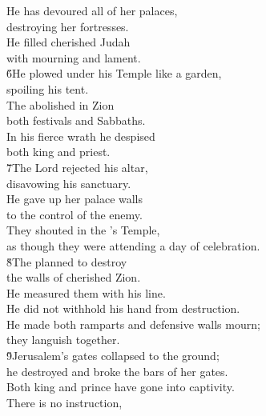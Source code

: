 \begin{poetry}
\poeml He has devoured all of her palaces, \\
\poemll    destroying her fortresses. \\
\poeml He filled cherished Judah \\
\poemll    with mourning and lament. \\
\poeml \v{6}He plowed under his Temple like a garden, \\
\poemll    spoiling his tent. \\
\poeml The  abolished in Zion \\
\poemll    both festivals and Sabbaths. \\
\poeml In his fierce wrath he despised \\
\poemll    both king and priest. \\
\poeml \v{7}The Lord rejected his altar, \\
\poemll    disavowing his sanctuary. \\
\poeml He gave up her palace walls \\
\poemll    to the control of the enemy. \\
\poeml They shouted in the 's Temple, \\
\poemll    as though they were attending a day of celebration. \\
\poeml \v{8}The  planned to destroy \\
\poemll    the walls of cherished Zion. \\
\poeml He measured them with his line. \\
\poemll    He did not withhold his hand from destruction. \\
\poeml He made both ramparts and defensive walls mourn; \\
\poemll    they languish together. \\
\poeml \v{9}Jerusalem's gates collapsed to the ground; \\
\poemll    he destroyed and broke the bars of her gates. \\
\poeml Both king and prince have gone into captivity. \\
\poemll    There is no instruction, \\

\end{poetry}
